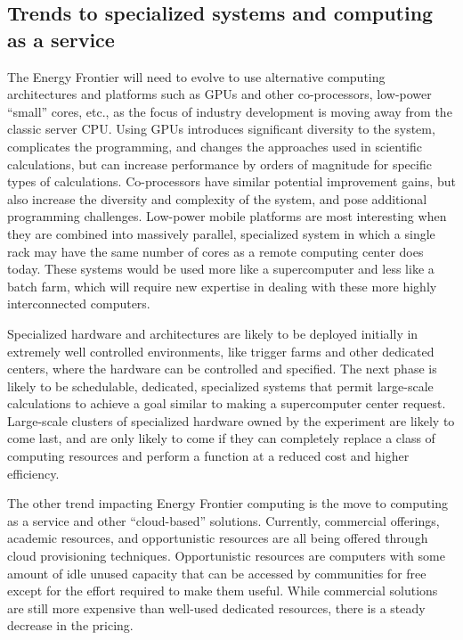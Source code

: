 \subsection{Trends to specialized systems and computing as a service}
The Energy Frontier will need to evolve to use alternative computing
architectures and platforms such as GPUs and other co-processors,  low-power
``small'' cores, etc., as the focus of industry development is moving away from
the classic server CPU.  Using GPUs introduces significant diversity to the
system, complicates the programming, and changes the approaches used in
scientific calculations, but can increase performance by orders of magnitude
for specific types of calculations.  Co-processors have similar potential
improvement gains, but also increase the diversity and complexity of the
system, and pose additional programming challenges.  Low-power mobile
platforms are most interesting when they are combined into massively parallel,
specialized system in which a single rack 
may have the same number of cores as a
remote computing center does today.  These systems would be used more like a
supercomputer and less like a batch farm, which will require new
expertise in dealing with these more highly interconnected computers.

Specialized hardware and architectures are likely to be deployed initially in
extremely well controlled environments, like trigger farms and other dedicated
centers, where the hardware can be controlled and specified. The next phase is
likely to be schedulable, dedicated, specialized systems that permit large-scale
calculations to achieve a goal similar to making a supercomputer center
request.  Large-scale clusters of specialized hardware owned by the experiment
are likely to come last, and are only likely to come if they can completely
replace a class of computing resources and perform a function at a reduced
cost and higher efficiency.

The other trend impacting Energy Frontier computing is the move to computing as a service
and other ``cloud-based'' solutions.  Currently,  commercial offerings, academic
resources, and opportunistic resources are all being offered through cloud
provisioning techniques.  Opportunistic resources are computers with some amount
of idle unused capacity that can be accessed by communities for free
except for the effort required to make them useful.
While commercial solutions are still more expensive
than well-used dedicated resources, there is a steady decrease in the pricing.

